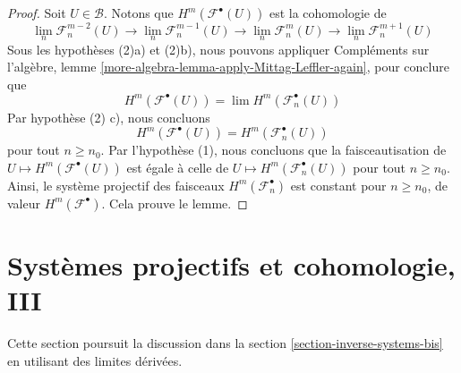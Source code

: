 \begin{proof}

Soit $U \in \mathcal{B}$. Notons que $H^m(\mathcal{F}^\bullet(U))$ est la cohomologie de
$$
\lim_n \mathcal{F}_n^{m - 2}(U) \to
\lim_n \mathcal{F}_n^{m - 1}(U) \to
\lim_n \mathcal{F}_n^m(U) \to
\lim_n \mathcal{F}_n^{m + 1}(U)
$$
Sous les hypothèses (2)a) et (2)b), nous pouvons appliquer Compléments sur l'algèbre, lemme \ref{more-algebra-lemma-apply-Mittag-Leffler-again},
pour conclure que
$$
H^m(\mathcal{F}^\bullet(U)) = \lim H^m(\mathcal{F}_n^\bullet(U))
$$
Par hypothèse (2) c), nous concluons
$$
H^m(\mathcal{F}^\bullet(U)) = H^m(\mathcal{F}_n^\bullet(U))
$$
pour tout $n \geq n_0$. Par l'hypothèse (1), nous concluons que la faisceautisation de
$U \mapsto H^m(\mathcal{F}^\bullet(U))$ est égale à celle de $U \mapsto H^m(\mathcal{F}_n^\bullet(U))$ pour tout $n \geq n_0$. Ainsi, le système projectif des faisceaux $H^m(\mathcal{F}_n^\bullet)$ est constant pour $n \geq n_0$, de valeur $H^m(\mathcal{F}^\bullet)$. Cela prouve le lemme.

\end{proof}











\section{Systèmes projectifs et cohomologie, III}

\label{section-inverse-systems-tri}

\noindent
Cette section poursuit la discussion dans la section \ref{section-inverse-systems-bis} en utilisant des limites dérivées.

